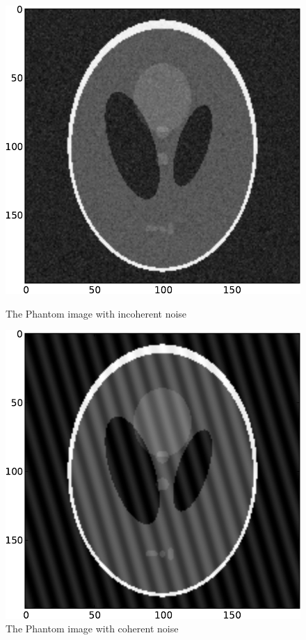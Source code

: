 \begin{figure}[t]
    \includegraphics[width=\linewidth]{phantom_random.pdf}
    \caption{The Phantom image with incoherent noise}
    \label{fig:incoherent}
\endminipage\hfill
{}
    \includegraphics[width=\linewidth]{phantom_coherent.pdf}
    \caption{The Phantom image with coherent noise}
    \label{fig:coherent}
\endminipage
\end{figure}

